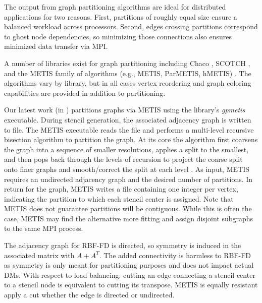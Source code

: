 \documentclass{report}
\begin{document}
The output from graph partitioning algorithms are ideal for distributed applications for two reasons. First, partitions of roughly equal size ensure a balanced workload across processors. Second, edges crossing partitions correspond to ghost node dependencies, so minimizing those connections also ensures minimized data transfer via MPI. 

A number of libraries exist for graph partitioning including Chaco \cite{CHACO1995}, SCOTCH \cite{SCOTCH1996}, and the METIS family of algorithms (e.g., METIS, ParMETIS, hMETIS) \cite{Karypis1999}. The algorithms vary by library, but in all cases vertex reordering and graph coloring capabilities are provided in addition to partitioning. %

Our latest work (in \cite{BolligRBFFDCode}) partitions graphs via METIS using the library's \emph{gpmetis} executable. During stencil generation, the associated adjacency graph is written to file. The METIS executable reads the file and performs a multi-level recursive bisection algorithm to partition the graph. At its core the algorithm first coarsens the graph into a sequence of smaller resolutions, applies a split to the smallest, and then pops back through the levels of recursion to project the coarse split onto finer graphs and smooth/correct the split at each level \cite{Karypis1999}. As input, METIS requires an undirected adjacency graph and the desired number of partitions. 
In return for the graph, METIS writes a file containing one integer per vertex, indicating the partition to which each stencil center is assigned. Note that METIS does not guarantee partitions will be contiguous. While this is often the case, METIS may find the alternative more fitting and assign disjoint subgraphs to the same MPI process. %

The adjacency graph for RBF-FD is directed, so symmetry is induced in the associated matrix with $A+A^T$. The added connectivity is harmless to RBF-FD as symmetry is only meant for partitioning purposes and does not impact actual DMs. With respect to load balancing: cutting an edge connecting a stencil center to a stencil node is equivalent to cutting its transpose. METIS is equally resistant apply a cut whether the edge is directed or undirected. 
\end{document}
